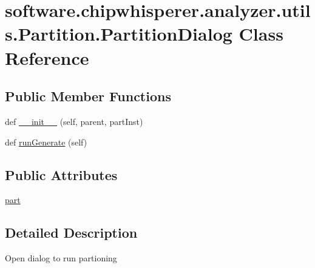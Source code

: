 \hypertarget{classsoftware_1_1chipwhisperer_1_1analyzer_1_1utils_1_1Partition_1_1PartitionDialog}{}\section{software.\+chipwhisperer.\+analyzer.\+utils.\+Partition.\+Partition\+Dialog Class Reference}
\label{classsoftware_1_1chipwhisperer_1_1analyzer_1_1utils_1_1Partition_1_1PartitionDialog}
\subsection*{Public Member Functions}
\begin{DoxyCompactItemize}
\item 
def \hyperlink{classsoftware_1_1chipwhisperer_1_1analyzer_1_1utils_1_1Partition_1_1PartitionDialog_a583ee02c784a903c3aef99a6433257a2}{\+\_\+\+\_\+init\+\_\+\+\_\+} (self, parent, part\+Inst)
\item 
def \hyperlink{classsoftware_1_1chipwhisperer_1_1analyzer_1_1utils_1_1Partition_1_1PartitionDialog_ab3facdcbde429d905a3532f6b3f1cb99}{run\+Generate} (self)
\end{DoxyCompactItemize}
\subsection*{Public Attributes}
\begin{DoxyCompactItemize}
\item 
\hyperlink{classsoftware_1_1chipwhisperer_1_1analyzer_1_1utils_1_1Partition_1_1PartitionDialog_a5b9489ab794a053397b9bfccbdbdf74f}{part}
\end{DoxyCompactItemize}


\subsection{Detailed Description}
\begin{DoxyVerb}Open dialog to run partioning\end{DoxyVerb}
 

